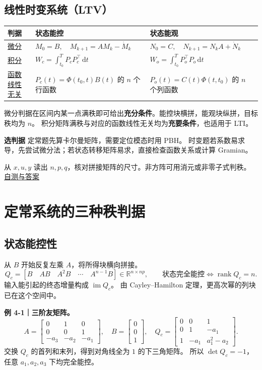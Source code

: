 \documentclass[UTF8,a4paper,12pt,fontset=fandol]{ctexart}
\DeclareMathOperator{\rank}{rank}
\DeclareMathOperator{\im}{im}
\newcommand{\dd}{\,\mathrm{d}}
\begin{document}
\subsection*{线性时变系统（LTV）}
\begingroup
\setlength{\extrarowheight}{5pt}
\begin{tabularx}{\linewidth}{@{}p{28mm}>{\raggedright\arraybackslash}X>{\raggedright\arraybackslash}X@{}}
\toprule
\textbf{判据} & \textbf{状态能控} & \textbf{状态能观} \\
\midrule
\hyperref[sec:diff]{微分} &
  $M_0=B,\quad M_{k+1}=AM_k-\dot M_k$ &
  $N_0=C,\quad N_{k+1}=N_kA+\dot N_k$ \\
\hyperref[sec:gram]{积分} &
  $W_c=\int_{t_0}^{T}P_cP_c^\top\dd t$ &
  $W_o=\int_{t_0}^{T}P_o^\top P_o\dd t$ \\
\hyperref[sec:function]{函数线性无关} &
  $P_c(t)=\Phi(t_0,t)B(t)$ 的 $n$ 个行函数 &
  $P_o(t)=C(t)\Phi(t,t_0)$ 的 $n$ 个列函数 \\
\bottomrule
\end{tabularx}
\endgroup

\begin{keybox}
微分判据在区间内某一点满秩即可给出\textbf{充分条件}。能控块横拼，能观块纵拼，目标秩均为 $n$。
积分矩阵满秩与对应的函数线性无关均为\textbf{充要条件}，也适用于 LTI。
\end{keybox}

\textbf{选判据} \quad
定常题先算卡尔曼矩阵，需要定位模态时用 PBH。
时变题若系数易求导，先尝试微分法；若状态转移矩阵易求，直接检查函数关系或计算 Gramian。

从 $x,u,y$ 读出 $n,p,q$，核对拼接矩阵的尺寸。非方阵可用消元或非零子式判秩。
\hfill\hyperref[sec:practice]{自测与答案}

\newpage
\section{定常系统的三种秩判据}\label{sec:lti}

\subsection*{状态能控性}
从 $B$ 开始反复左乘 $A$，将所得块横向拼接。
\[
  Q_c=[B\quad AB\quad A^2B\quad\cdots\quad A^{n-1}B]
    \in\mathbb R^{n\times np},
  \qquad \boxed{\text{状态完全能控}\iff \rank Q_c=n.}
\]
输入能引起的终态增量构成 $\im Q_c$。
由 Cayley--Hamilton 定理，更高次幂的列块已在这个空间中。

\textbf{例 4-1｜三阶友矩阵。}
\[
 A=\begin{bmatrix}0&1&0\\0&0&1\\-a_3&-a_2&-a_1\end{bmatrix},
 \quad B=\begin{bmatrix}0\\0\\1\end{bmatrix},
 \quad Q_c=\begin{bmatrix}0&0&1\\0&1&-a_1\\1&-a_1&a_1^2-a_2\end{bmatrix}.
\]
交换 $Q_c$ 的首列和末列，得到对角线全为 $1$ 的下三角矩阵。
所以 $\det Q_c=-1$，任意 $a_1,a_2,a_3$ 下均完全能控。
\end{document}
